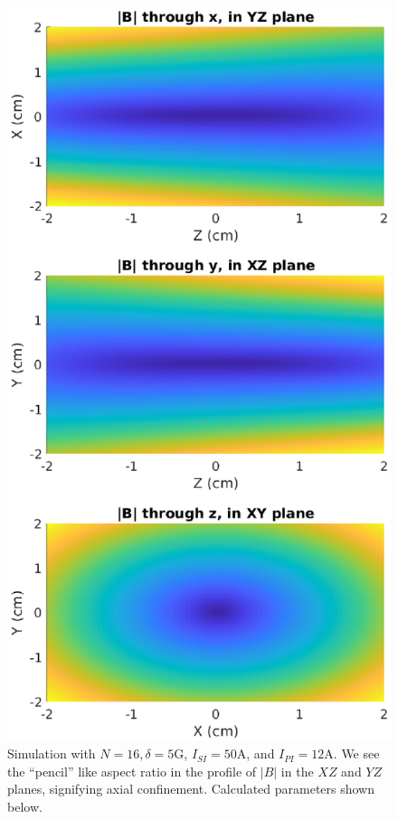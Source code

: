 \documentclass{book}
\theoremstyle{definition}
\begin{document}
\begin{figure}[!htb]
\begin{minipage}{.49\textwidth}
		\includegraphics[width=\linewidth]{sim-figs/IP-2.eps}
	\end{minipage}%
	\caption{Simulation with $N = 16, \delta = 5$G, $I_{SI} = 50$A, and $I_{PI}=12$A. We see the ``pencil'' like aspect ratio in the profile of $|B|$ in the $XZ$ and $YZ$ planes, signifying axial confinement. Calculated parameters shown below.}
\end{figure}
\end{document}
